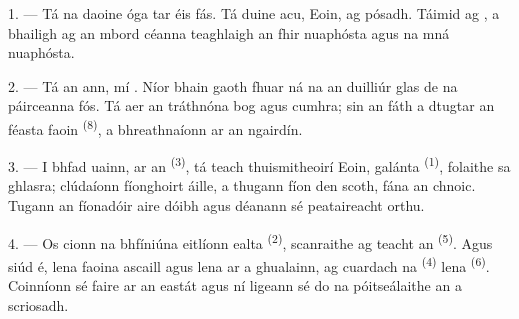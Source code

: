 %

\VUsaut{4.0mm}
\VUsaut{1.6mm}
\VUsaut{3.2mm}

\VUsaut{1.6mm}
\VUsaut{2.6mm}

\VUsaut{3.0mm}

1. --- Tá na daoine óga tar éis fás. Tá duine acu, Eoin, ag pósadh. Táimid ag
, a bhailigh ag an mbord céanna teaghlaigh an fhir
nuaphósta agus na mná nuaphósta.

2. --- Tá an  ann, mí . Níor bhain gaoth
fhuar  ná na  an duilliúr glas de na
páirceanna fós. Tá aer an tráthnóna bog agus cumhra; sin an fáth a dtugtar an
féasta faoin  \textsuperscript{(8)}, a bhreathnaíonn ar an
ngairdín.

3. --- I bhfad uainn, ar an  \textsuperscript{(3)}, tá teach
thuismitheoirí Eoin,  galánta \textsuperscript{(1)}, folaithe sa
ghlasra; clúdaíonn fíonghoirt áille, a thugann fíon den scoth, fána an chnoic. Tugann
an fíonadóir aire dóibh agus déanann sé peataireacht orthu.

4. --- Os cionn na bhfíniúna eitlíonn ealta 
\textsuperscript{(2)}, scanraithe ag teacht an 
\textsuperscript{(5)}. Agus siúd é, lena  faoina ascaill agus lena
 ar a ghualainn, ag cuardach na 
\textsuperscript{(4)} lena  \textsuperscript{(6)}. Coinníonn sé
faire ar an eastát agus ní ligeann sé do na póitseálaithe an  a
scriosadh.

